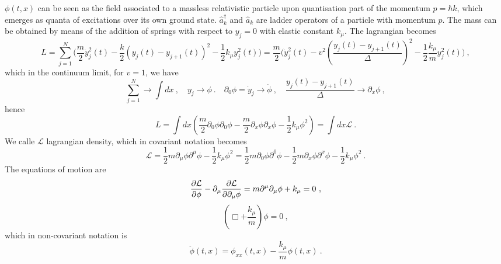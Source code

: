     $\phi(t, x)$ can be seen as the field associated to a massless relativistic particle upon quantisation part of the momentum $p = \hbar k$, which emerges as quanta of excitations over its own ground state. $\hat a^\dagger_k$ and $\hat a_k$ are ladder operators of a particle with momentum $p$. The mass can be obtained by means of the addition of springs with respect to $y_j = 0$ with elastic constant $k_\mu$. The lagrangian becomes 
    \begin{equation*}
        L = \sum_{j = 1}^{N} \Big ( \frac{m}{2} \dot y_j^2 (t) - \frac{k}{2} (y_j(t) - y_{j+1} (t) )^2 - \frac{1}{2} k_\mu y_j^2(t) \Big) = \frac{m}{2} \Big ( \dot y_j^2 (t) - v^2 (\frac{y_j(t) - y_{j+1} (t)}{\Delta} )^2 - \frac{1}{2} \frac{k_\mu}{m} y_j^2(t) \Big) ~,
    \end{equation*}
    which in the continuum limit, for $v = 1$, we have
    \begin{equation*}
        \sum_{j = 1}^{N} \rightarrow \int dx ~, \quad y_j \rightarrow \phi ~. \quad \partial_0 \phi = \dot y_j \rightarrow \dot \phi ~, \quad \frac{y_j(t) - y_{j+1} (t)}{\Delta} \rightarrow \partial_x \phi ~,
    \end{equation*}
    hence 
    \begin{equation*}
        L = \int dx (\frac{m}{2} \partial_0 \phi \partial_0 \phi - \frac{m}{2} \partial_x \phi \partial_x \phi  - \frac{1}{2} k_\mu \phi^2 ) = \int dx \mathcal L~.
    \end{equation*}
    We calle $\mathcal L$ lagrangian density, which in covariant notation becomes 
    \begin{equation*}
        \mathcal L = \frac{1}{2} m \partial_\mu \phi \partial^\mu \phi - \frac{1}{2} k_\mu \phi^2 =  \frac{1}{2} m \partial_0 \phi \partial^0 \phi - \frac{1}{2} m \partial_x \phi \partial^x \phi- \frac{1}{2} k_\mu \phi^2 ~.
    \end{equation*}
    The equations of motion are 
    \begin{equation*}
        \frac{\partial\mathcal L}{\partial\phi} - \partial_\mu \frac{\partial\mathcal L}{\partial\partial_\mu \phi} = m \partial^\mu \partial_\mu \phi + k_\mu = 0 ~,
    \end{equation*}
    \begin{equation*}
        (\Box + \frac{k_\mu }{m}) \phi = 0 ~,
    \end{equation*}
    which in non-covariant notation is 
    \begin{equation*}
        \ddot \phi(t, x) = \phi_{xx} (t, x) - \frac{k_\mu}{m} \phi(t, x) ~.
    \end{equation*}
